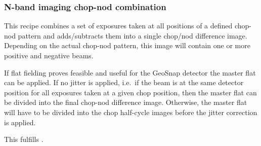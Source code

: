 \subsubsection{N-band imaging chop-nod combination}
\label{img_n_chopnod}
\label{rec:img_n_chopnod}
\label{rec:metis_n_img_chopnod}
\label{sssec:img_n_chopnod}

This recipe combines a set of exposures taken at all positions of a
defined chop-nod pattern and adds/subtracts them into a single
chop/nod difference image. Depending on the actual chop-nod pattern,
this image will contain one or more positive and negative beams.

If flat fielding proves feasible and useful for the GeoSnap detector
the master flat can be applied. If no jitter is applied, i.e.\ if the
beam is at the same detector position for all exposures taken at a
given chop position, then the master flat can be divided into the
final chop-nod difference image. Otherwise, the master flat will have
to be divided into the chop half-cycle images before the jitter
correction is applied.

This fulfills .

